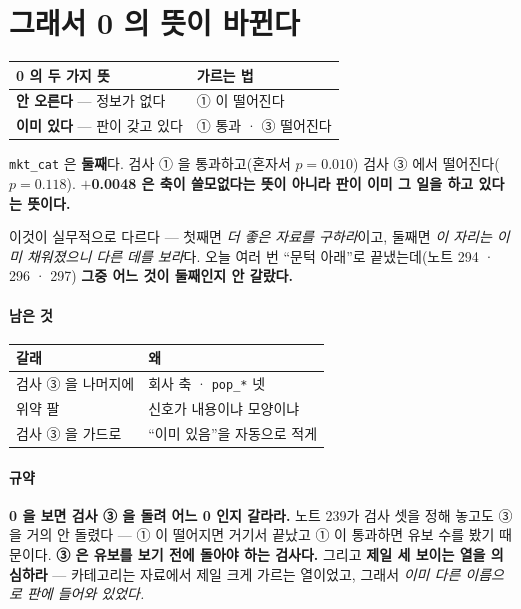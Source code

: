 \documentclass[10pt]{article}
\begin{document}
\section{그래서 0 의 뜻이 바뀐다}

\begin{center}\footnotesize
\begin{tabular}{ll}
\hline
0 의 두 가지 뜻 & 가르는 법 \\
\hline
\textbf{안 오른다} --- 정보가 없다 & ① 이 떨어진다 \\
\textbf{이미 있다} --- 판이 갖고 있다 & ① 통과 · ③ 떨어진다 \\
\hline
\end{tabular}
\end{center}

\texttt{mkt\_cat} 은 \textbf{둘째}다. 검사 ① 을 통과하고(혼자서 $p{=}0.010$)
검사 ③ 에서 떨어진다($p{=}0.118$). \textbf{$+$0.0048 은 축이 쓸모없다는
뜻이 아니라 판이 이미 그 일을 하고 있다는 뜻이다.}

이것이 실무적으로 다르다 --- 첫째면 \emph{더 좋은 자료를 구하라}이고, 둘째면
\emph{이 자리는 이미 채워졌으니 다른 데를 보라}다. 오늘 여러 번 ``문턱 아래''로
끝냈는데(노트 294 · 296 · 297) \textbf{그중 어느 것이 둘째인지 안 갈랐다.}

\paragraph{남은 것}
\begin{center}\small
\begin{tabular}{ll}
\hline
갈래 & 왜 \\
\hline
검사 ③ 을 나머지에 & 회사 축 · \texttt{pop\_*} 넷 \\
위약 팔 & 신호가 내용이냐 모양이냐 \\
검사 ③ 을 가드로 & ``이미 있음''을 자동으로 적게 \\
\hline
\end{tabular}
\end{center}

\paragraph{규약} \textbf{0 을 보면 검사 ③ 을 돌려 어느 0 인지 갈라라.} 노트
239가 검사 셋을 정해 놓고도 ③ 을 거의 안 돌렸다 --- ① 이 떨어지면 거기서
끝났고 ① 이 통과하면 유보 수를 봤기 때문이다. \textbf{③ 은 유보를 보기 전에
돌아야 하는 검사다.} 그리고 \textbf{제일 세 보이는 열을 의심하라} --- 카테고리는
자료에서 제일 크게 가르는 열이었고, 그래서 \emph{이미 다른 이름으로 판에
들어와 있었다.}
\end{document}
